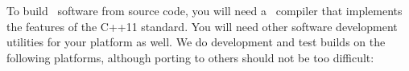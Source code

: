 
To build \OOMMF\ software from source code, you will
need a \Cplusplus\ compiler
that implements the features of the C++11 standard.
You will need other software
development utilities for your platform as well.
We do development and
test builds on the following platforms, although porting to others
should not be too difficult:

